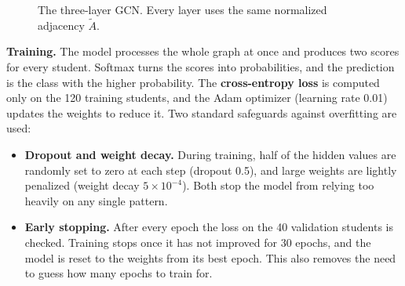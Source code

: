 \documentclass[11pt,a4paper]{article}
\newcommand{\Anorm}{\tilde{A}}
\begin{document}
\begin{figure}[H]
\centering
{}
\caption{The three-layer GCN. Every layer uses the same normalized adjacency $\Anorm$.}
\label{fig:arch}
\end{figure}

\textbf{Training.} The model processes the whole graph at once and produces two scores for every student. Softmax turns the scores into probabilities, and the prediction is the class with the higher probability. The \textbf{cross-entropy loss} is computed only on the 120 training students, and the Adam optimizer (learning rate 0.01) updates the weights to reduce it. Two standard safeguards against overfitting are used:
\begin{itemize}
  \item \textbf{Dropout and weight decay.} During training, half of the hidden values are randomly set to zero at each step (dropout 0.5), and large weights are lightly penalized (weight decay $5\times10^{-4}$). Both stop the model from relying too heavily on any single pattern.
  \item \textbf{Early stopping.} After every epoch the loss on the 40 validation students is checked. Training stops once it has not improved for 30 epochs, and the model is reset to the weights from its best epoch. This also removes the need to guess how many epochs to train for.
\end{itemize}
\end{document}
